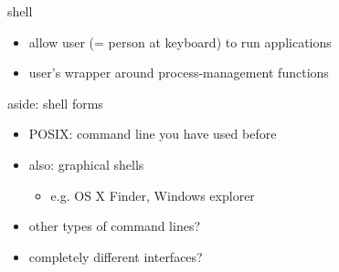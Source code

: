\begin{frame}{shell}
\begin{itemize}
    \item allow user (= person at keyboard) to run applications
    \item user's wrapper around process-management functions
\end{itemize}
\end{frame}

\begin{frame}{aside: shell forms}
\begin{itemize}
    \item POSIX: command line you have used before
        \vspace{.5cm}
    \item also: graphical shells
        \begin{itemize}
        \item e.g. OS X Finder, Windows explorer
        \end{itemize}
    \item other types of command lines?
    \item completely different interfaces?
\end{itemize}
\end{frame}

